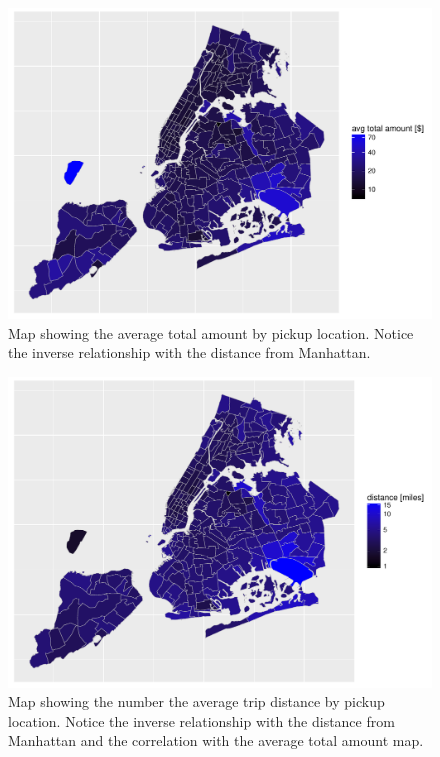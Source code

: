 \documentclass{acm_proc_article-sp-sigmod09}
\begin{document}
\begin{figure}
	\centering
	\includegraphics[width=1\columnwidth]{resources/base_plots/avg_total_amount_by_pickup_location_map.pdf}
	\caption{Map showing the average total amount by pickup location. Notice the inverse relationship with the distance from Manhattan.}
	\label{fig:totalAmountMap}
\end{figure}

\begin{figure}
	\centering
	\includegraphics[width=1\columnwidth]{resources/base_plots/avg_distance_by_pickup_location_map.pdf}
	\caption{Map showing the number the average trip distance by pickup location. Notice the inverse relationship with the distance from Manhattan and the correlation with the average total amount map.}
	\label{fig:distanceMap}
\end{figure}
\end{document}
